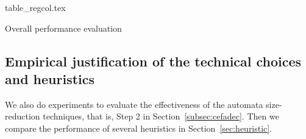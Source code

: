 \begin{table}
  \centering\vskip 0pt
    {table_regcol.tex}
    \caption{Overall performance evaluation}
  \label{fig:table_overall_eval}
\end{table}





\subsection{Empirical justification of the technical choices and heuristics}\label{subsec:size_reduction_eval}
We also do experiments to evaluate the effectiveness of the automata size-reduction techniques, that is, Step 2 in Section~\ref{subsec:cefadec}. Then we compare the performance of several heuristics in Section~\ref{sec:heuristic}.
